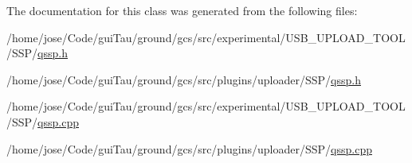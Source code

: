 The documentation for this class was generated from the following files\-:\begin{DoxyCompactItemize}
\item 
/home/jose/\-Code/gui\-Tau/ground/gcs/src/experimental/\-U\-S\-B\-\_\-\-U\-P\-L\-O\-A\-D\-\_\-\-T\-O\-O\-L/\-S\-S\-P/\hyperlink{experimental_2_u_s_b___u_p_l_o_a_d___t_o_o_l_2_s_s_p_2qssp_8h}{qssp.\-h}\item 
/home/jose/\-Code/gui\-Tau/ground/gcs/src/plugins/uploader/\-S\-S\-P/\hyperlink{plugins_2uploader_2_s_s_p_2qssp_8h}{qssp.\-h}\item 
/home/jose/\-Code/gui\-Tau/ground/gcs/src/experimental/\-U\-S\-B\-\_\-\-U\-P\-L\-O\-A\-D\-\_\-\-T\-O\-O\-L/\-S\-S\-P/\hyperlink{experimental_2_u_s_b___u_p_l_o_a_d___t_o_o_l_2_s_s_p_2qssp_8cpp}{qssp.\-cpp}\item 
/home/jose/\-Code/gui\-Tau/ground/gcs/src/plugins/uploader/\-S\-S\-P/\hyperlink{plugins_2uploader_2_s_s_p_2qssp_8cpp}{qssp.\-cpp}\end{DoxyCompactItemize}
